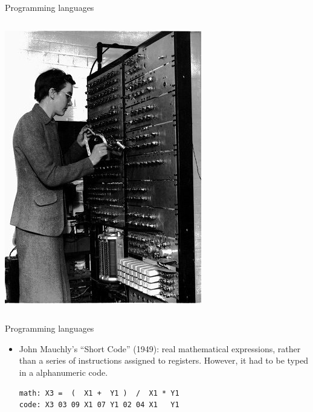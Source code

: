 \documentclass[aspectratio=169]{beamer}
\begin{document}
\begin{frame}{Programming languages}
\begin{itemize}
\begin{columns}
\includegraphics[width=\linewidth]{PLOTS/kathleen-booth.jpg}
\end{columns}
\end{itemize}
\end{frame}

\begin{frame}[fragile]{Programming languages}
\vspace{0.35 cm}
\begin{itemize}\setlength{\itemsep}{0.35 cm}
\item John Mauchly's ``Short Code'' (1949): real mathematical expressions, rather than a series of instructions assigned to registers. However, it had to be typed in a alphanumeric code.

\vspace{0.5 cm}
\begin{minipage}{0.8\linewidth}
\begin{verbatim}
math: X3 =  (  X1 +  Y1 )  /  X1 * Y1
code: X3 03 09 X1 07 Y1 02 04 X1   Y1
\end{verbatim}
\end{minipage}

\vspace{0.5 cm}
\end{itemize}
\end{frame}
\end{document}
